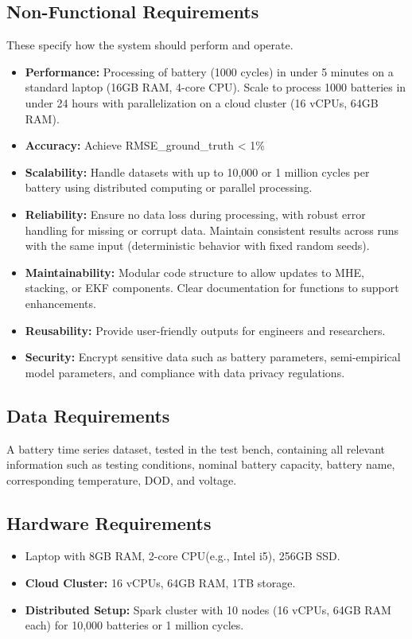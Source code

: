 \subsection{Non-Functional Requirements}
These specify how the system should perform and operate.
\begin{itemize}
    \item \textbf{Performance:} Processing of battery (1000 cycles) in under 5 minutes on a standard laptop (16GB RAM, 4-core CPU). Scale to process 1000 batteries in under 24 hours with parallelization on a cloud cluster (16 vCPUs, 64GB RAM).
    \item \textbf{Accuracy:} Achieve RMSE\_ground\_truth < 1\% %
    \item \textbf{Scalability:} Handle datasets with up to 10,000 or 1 million cycles per battery using distributed computing or parallel processing.
    \item \textbf{Reliability:} Ensure no data loss during processing, with robust error handling for missing or corrupt data. Maintain consistent results across runs with the same input (deterministic behavior with fixed random seeds).
    \item \textbf{Maintainability:} Modular code structure to allow updates to MHE, stacking, or EKF components. Clear documentation for functions to support enhancements.
    \item \textbf{Reusability:} Provide user-friendly outputs for engineers and researchers.
    \item \textbf{Security:} Encrypt sensitive data such as battery parameters, semi-empirical model parameters, and compliance with data privacy regulations.
\end{itemize}

\subsection{Data Requirements}
A battery time series dataset, tested in the test bench, containing all relevant information such as testing conditions, nominal battery capacity, battery name, corresponding temperature, DOD, and voltage. 


\subsection{Hardware Requirements}
\begin{itemize}
    \item Laptop with 8GB RAM, 2-core CPU(e.g., Intel i5), 256GB SSD.
    \item \textbf{Cloud Cluster:} 16 vCPUs, 64GB RAM, 1TB storage.
    \item \textbf{Distributed Setup:} Spark cluster with 10 nodes (16 vCPUs, 64GB RAM each) for 10,000 batteries or 1 million cycles.
\end{itemize}

